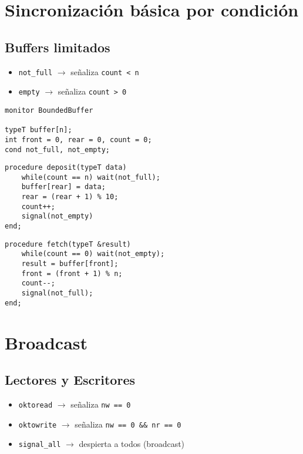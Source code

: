 \documentclass[a4paper, 10pt]{report}
\begin{document}
\section{Sincronización básica por condición}

\subsection{Buffers limitados}

\begin{itemize}
	\item \lstinline{not_full} $\rightarrow$ señaliza \lstinline{count < n}
	\item \lstinline{empty} $\rightarrow$ señaliza \lstinline{count > 0}
\end{itemize}

\begin{lstlisting}
monitor BoundedBuffer

typeT buffer[n];
int front = 0, rear = 0, count = 0;
cond not_full, not_empty;
\end{lstlisting}

\noindent
\begin{minipage}{0.5\textwidth}
\begin{lstlisting}[firstnumber=6]
procedure deposit(typeT data)
	while(count == n) wait(not_full);
	buffer[rear] = data;
	rear = (rear + 1) % 10;
	count++;
	signal(not_empty)
end;
\end{lstlisting}
\end{minipage}
\begin{minipage}{0.5\textwidth}
\begin{lstlisting}[firstnumber=13]
procedure fetch(typeT &result)
	while(count == 0) wait(not_empty);
	result = buffer[front];
	front = (front + 1) % n;
	count--;
	signal(not_full);
end;
\end{lstlisting}
\end{minipage}

\section{Broadcast}

\subsection{Lectores y Escritores}

\begin{itemize}
	\item \lstinline{oktoread} $\rightarrow$ señaliza \lstinline{nw == 0}
	\item \lstinline{oktowrite} $\rightarrow$ señaliza \lstinline{nw == 0 && nr == 0}
	\item \lstinline{signal_all} $\rightarrow$ despierta a todos (broadcast)
\end{itemize}
\end{document}
